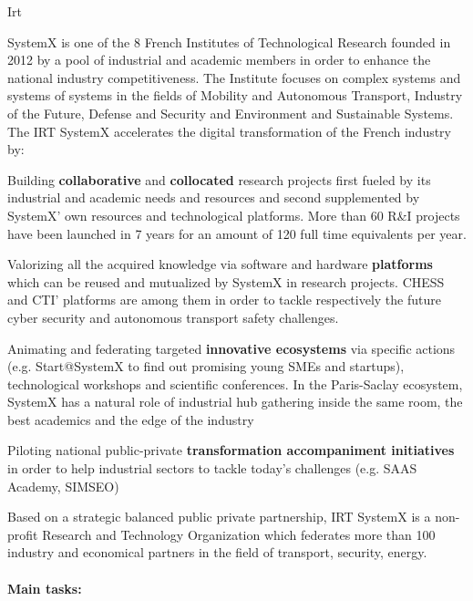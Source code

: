 \begin{sitedescription}{Irt}




SystemX is one of the 8 French Institutes of Technological Research founded in 2012 by a pool of industrial and academic members in order to enhance the national industry competitiveness. The Institute focuses on complex systems and systems of systems in the fields of Mobility and Autonomous Transport, Industry of the Future, Defense and Security and Environment and Sustainable Systems. The IRT SystemX accelerates the digital transformation of the French industry by:

\begin{compactitem}
\item Building {\bf collaborative} and {\bf collocated} research projects first fueled by its industrial and academic needs and resources and second supplemented by SystemX’ own resources and technological platforms. More than 60 R\&I projects have been launched in 7 years for an amount of 120 full time equivalents per year.
\item Valorizing all the acquired knowledge via software and hardware {\bf platforms} which can be reused and mutualized by SystemX in research projects. CHESS and CTI’ platforms are among them in order to tackle respectively the future cyber security and autonomous transport safety challenges.
\item Animating and federating targeted {\bf innovative ecosystems} via specific actions (e.g. Start@SystemX to find out promising young SMEs and startups), technological workshops and scientific conferences. In the Paris-Saclay ecosystem, SystemX has a natural role of industrial hub gathering inside the same room, the best academics and the edge of the industry
\item Piloting national public-private {\bf transformation accompaniment initiatives} in order to help industrial sectors to tackle today’s challenges (e.g. SAAS Academy, SIMSEO)
\end{compactitem}

Based on a strategic balanced public private partnership, IRT SystemX is a non-profit Research and Technology Organization which federates more than 100 industry and economical partners in the field of transport, security, energy.



\paragraph{Main tasks:}


\end{sitedescription}
